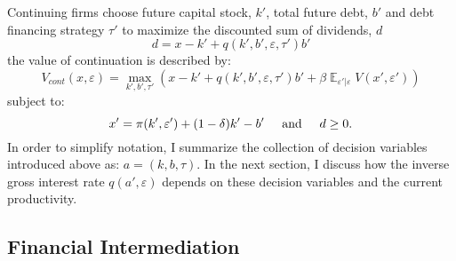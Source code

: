 \documentclass[12pt]{article}
\DeclareMathOperator{\E}{\mathbb{E}}
\begin{document}
Continuing firms choose future capital stock, $k'$, total future debt, $b'$ and debt financing strategy $\tau'$ to maximize the discounted sum of dividends, $d$ 
\begin{equation} \label{eq:dividends}
d = x - k' +  q(k',b',\varepsilon, \tau')b'
\end{equation} 
the value of continuation is described by:
\begin{equation} \label{eq:V_cont}
    V_{cont}(x,\varepsilon) = \max_{k',b', \tau'} \left(x - k' +  q(k',b',\varepsilon, \tau')b' + \beta \E_{\varepsilon'|\varepsilon} V(x',\varepsilon') \right)
\end{equation}
subject to: 
\begin{equation} \label{eq:budget}
x' = \pi(k',\varepsilon')+(1-\delta)k'-b' \hspace{5mm} \text{and} \hspace{5mm} d \geq 0.
\end{equation}
In order to simplify notation, I summarize the collection of decision variables introduced above as: $a = (k, b, \tau) $. In the next section, I discuss how the inverse gross interest rate $q(a',\varepsilon)$ depends on these decision variables and the current productivity.

\subsection{Financial Intermediation}  \label{sec: Financial Intermediation}
\end{document}
